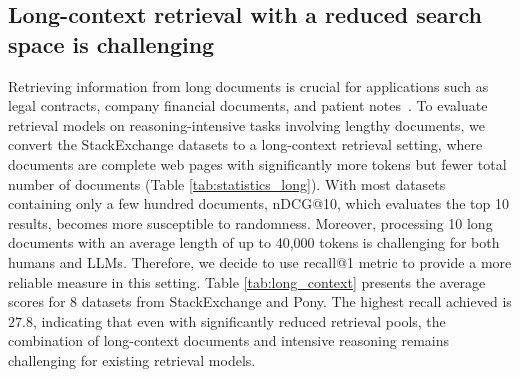 \vspace{-10pt}
\subsection{Long-context retrieval with a reduced search space is challenging}
\label{sec:long_context_retrieval}
Retrieving information from long documents is crucial for applications such as legal contracts, company financial documents, and patient notes~\citep{saad2024benchmarking,zhu2024longembed}. 
To evaluate retrieval models on reasoning-intensive tasks involving lengthy documents, we convert the StackExchange datasets to a long-context retrieval setting, where documents are complete web pages with significantly more tokens but fewer total number of documents (Table \ref{tab:statistics_long}).
With most datasets containing only a few hundred documents, nDCG@10, which evaluates the top 10 results, becomes more susceptible to randomness. 
Moreover, processing 10 long documents with an average length of up to 40,000 tokens is challenging for both humans and LLMs. 
Therefore, we decide to use recall@1 metric to provide a more reliable measure in this setting.
Table \ref{tab:long_context} presents the average scores for 8 datasets from StackExchange and Pony. The highest recall achieved is $27.8$, indicating that even with significantly reduced retrieval pools, the combination of long-context documents and intensive reasoning remains challenging for existing retrieval models.

